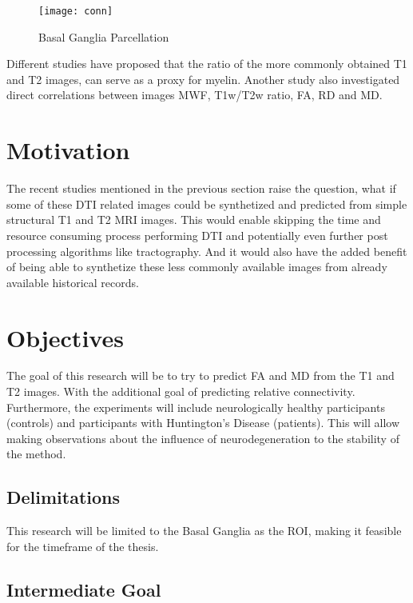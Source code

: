 \begin{figure}[H]
\centering
\texttt{[image: conn]}
\caption{Basal Ganglia Parcellation}
\label{fig:conn}
\end{figure}
Different studies have proposed that the ratio of the more commonly obtained T1 and T2 images, can serve as a proxy for myelin. \cite{myelin1} \cite{myelin2} Another study also investigated direct correlations between images \ac{MWF}, T1w/T2w ratio, \ac{FA}, \ac{RD} and \ac{MD}. \cite{myelin3}

\section{Motivation}

The recent studies mentioned in the previous section raise the question, what if some of these \ac{DTI} related images could be synthetized and predicted from simple structural T1 and T2 \ac{MRI} images. This would enable skipping the time and resource consuming process performing \ac{DTI} and potentially even further post processing algorithms like tractography. And it would also have the added benefit of being able to synthetize these less commonly available images from already available historical records.

\section{Objectives}

The goal of this research will be to try to predict \ac{FA} and \ac{MD} from the T1 and T2 images. With the additional goal of predicting relative connectivity. Furthermore, the experiments will include neurologically healthy participants (controls) and participants with Huntington's Disease (patients). This will allow making observations about the influence of neurodegeneration to the stability of the method.

\subsection{Delimitations}

This research will be limited to the Basal Ganglia as the \ac{ROI}, making it feasible for the timeframe of the thesis.

\subsection{Intermediate Goal}


